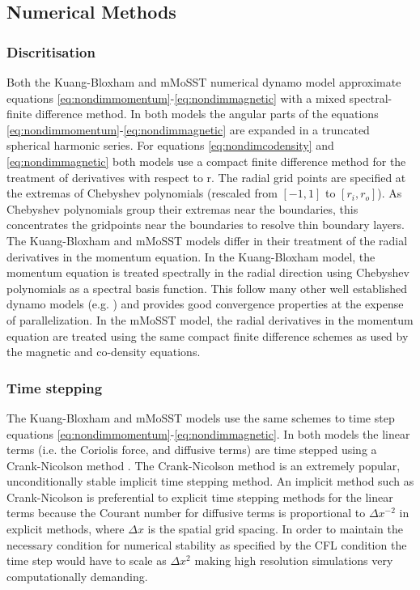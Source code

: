 \subsection{Numerical Methods}

\subsubsection{Discritisation}
Both the Kuang-Bloxham and mMoSST numerical dynamo model approximate equations \ref{eq:nondimmomentum}-\ref{eq:nondimmagnetic} with a mixed spectral-finite difference method. In both models the angular parts of the equations \ref{eq:nondimmomentum}-\ref{eq:nondimmagnetic} are expanded in a truncated spherical harmonic series. For equations \ref{eq:nondimcodensity} and \ref{eq:nondimmagnetic} both models use a compact finite difference method \citep{lele1992} for the treatment of derivatives with respect to r. The radial grid points are specified at the extremas of Chebyshev polynomials (rescaled from $[-1, 1]$ to $[r_i, r_o]$). As Chebyshev polynomials group their extremas near the boundaries, this concentrates the gridpoints near the boundaries to resolve thin boundary layers. The Kuang-Bloxham and mMoSST models differ in their treatment of the radial derivatives in the momentum equation. In the Kuang-Bloxham model, the momentum equation is treated spectrally in the radial direction using Chebyshev polynomials as a spectral basis function. This follow many other well established dynamo models (e.g. \citet{wicht2002}) and provides good convergence properties at the expense of parallelization. In the mMoSST model, the radial derivatives in the momentum equation are treated using the same compact finite difference schemes as used by the magnetic and co-density equations.

\subsubsection{Time stepping}
The Kuang-Bloxham and mMoSST models use the same schemes to time step equations \ref{eq:nondimmomentum}-\ref{eq:nondimmagnetic}. In both models the linear terms (i.e. the Coriolis force, and diffusive terms) are time stepped using a Crank-Nicolson method \citep{crank1947}. The Crank-Nicolson method is an extremely popular,  unconditionally stable implicit time stepping method. An implicit method such as Crank-Nicolson is preferential to explicit time stepping methods for the linear terms because the Courant number for diffusive terms is proportional to $\Delta x^{-2}$ in explicit methods, where $\Delta x$ is the spatial grid spacing. In order to maintain the necessary condition for numerical stability as specified by the CFL condition \citep{courant1967} the time step would have to scale as $\Delta x ^{2}$ making high resolution simulations very computationally demanding. 

